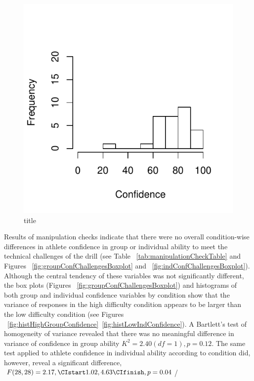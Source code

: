 \begin{figure}
  \centering
  \includegraphics{images/histLowIndConfidence-1}
  \caption{title}
  \label{}
\end{figure}




Results of manipulation checks indicate that there were no overall condition-wise differences in athlete confidence in group or individual ability to meet the technical challenges of the drill (see Table ~\ref{tab:manipulationCheckTable} and Figures ~\ref{fig:groupConfChallengesBoxplot} and ~\ref{fig:indConfChallengesBoxplot}).
Although the central tendency of these variables was not significantly different, the box plots (Figures ~\ref{fig:groupConfChallengesBoxplot}) and histograms of both group and individual confidence variables by condition show that the variance of responses in the high difficulty condition appears to be larger than the low difficulty condition (see Figures ~\ref{fig:histHighGroupConfidence}\nobreakdash~\ref{fig:histLowIndConfidence}).
A Bartlett's test of homogeneity of variance revealed that there was no meaningful difference in variance of confidence in group ability $K^2 = 2.40 (df = 1), p = 0.12$.  The same test applied to athlete confidence in individual ability according to condition did, however, reveal a significant difference, $F(28,28) = 2.17, \CIstart 1.02, 4.63 \CIfinish, p = 0.04$/

